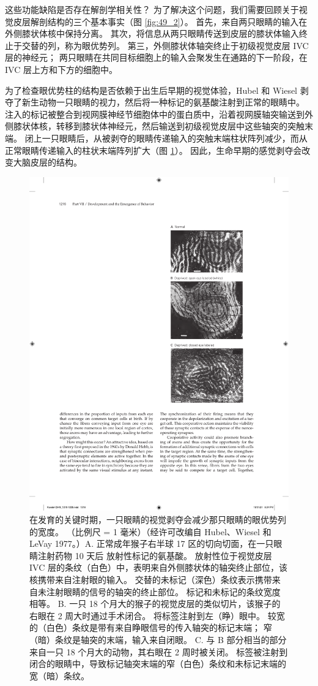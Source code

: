 这些功能缺陷是否存在解剖学相关性？
为了解决这个问题，我们需要回顾关于视觉皮层解剖结构的三个基本事实（图 \ref{fig:49_2}）。
首先，来自两只眼睛的输入在外侧膝状体核中保持分离。
其次，将信息从两只眼睛传送到皮层的膝状体输入终止于交替的列，称为眼优势列。
第三，外侧膝状体轴突终止于初级视觉皮层 IVC 层的神经元；
两只眼睛在共同目标细胞上的输入会聚发生在通路的下一阶段，在 IVC 层上方和下方的细胞中。


为了检查眼优势柱的结构是否依赖于出生后早期的视觉体验，Hubel 和 Wiesel 剥夺了新生动物一只眼睛的视力，然后将一种标记的氨基酸注射到正常的眼睛中。
注入的标记被整合到视网膜神经节细胞体中的蛋白质中，沿着视网膜轴突输送到外侧膝状体核，转移到膝状体神经元，然后输送到初级视觉皮层中这些轴突的突触末端。
闭上一只眼睛后，从被剥夺的眼睛传递输入的突触末端柱状阵列减少，而从正常眼睛传递输入的柱状末端阵列扩大（图 \ref{fig:49_4}）。
因此，生命早期的感觉剥夺会改变大脑皮层的结构。


\begin{figure}[htbp]
	\centering
	\includegraphics[width=0.5\linewidth]{chap49/fig_49_4}
	\caption{在发育的关键时期，一只眼睛的视觉剥夺会减少那只眼睛的眼优势列的宽度。 （比例尺 = 1 毫米）（经许可改编自 Hubel、Wiesel 和 LeVay 1977。）A. 正常成年猴子右半球 17 区的切向切面，在一只眼睛注射药物 10 天后 放射性标记的氨基酸。 放射性位于视觉皮层 IVC 层的条纹（白色）中，表明来自外侧膝状体的轴突终止部位，该核携带来自注射眼的输入。 交替的未标记（深色）条纹表示携带来自未注射眼睛的信号的轴突的终止部位。 标记和未标记的条纹宽度相等。 B. 一只 18 个月大的猴子的视觉皮层的类似切片，该猴子的右眼在 2 周大时通过手术闭合。 将标签注射到左（睁）眼中。 较宽的（白色）条纹是带有来自睁眼信号的传入轴突的标记末端； 窄（暗）条纹是轴突的末端，输入来自闭眼。 C. 与 B 部分相当的部分来自一只 18 个月大的动物，其右眼在 2 周时被关闭。 标签被注射到闭合的眼睛中，导致标记轴突末端的窄（白色）条纹和未标记末端的宽（暗）条纹。}
	\label{fig:49_4}
\end{figure}

